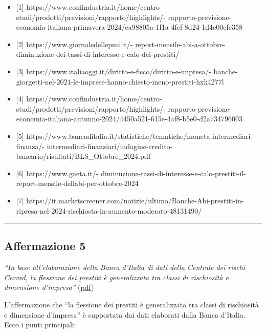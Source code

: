 \documentclass[
  letterpaper,
  DIV=11,
  numbers=noendperiod]{scrartcl}
\providecommand{\tightlist}{%
  \setlength{\itemsep}{0pt}\setlength{\parskip}{0pt}}\usepackage{longtable,booktabs,array}
\begin{document}
\begin{itemize}
\tightlist
\item
  {[}1{]}
  https://www.confindustria.it/home/centro-studi/prodotti/previsioni/rapporto/highlights/-
  rapporto-previsione-economia-italiana-primavera-2024/ca98805a-1f1a-4fef-8d24-1d4e00cfe358
\item
  {[}2{]} https://www.giornaledellepmi.it/-
  report-mensile-abi-a-ottobre-diminuzione-dei-tassi-di-interesse-e-calo-dei-prestiti/
\item
  {[}3{]} https://www.italiaoggi.it/diritto-e-fisco/diritto-e-impresa/-
  banche-giorgetti-nel-2024-le-imprese-hanno-chiesto-meno-prestiti-hxk4277l
\item
  {[}4{]}
  https://www.confindustria.it/home/centro-studi/prodotti/previsioni/rapporto/highlights/-
  rapporto-previsione-economia-italiana-autunno-2024/4450a521-615e-4af8-b5e0-d2a734796003
\item
  {[}5{]}
  https://www.bancaditalia.it/statistiche/tematiche/moneta-intermediari-finanza/-
  intermediari-finanziari/indagine-credito-bancario/risultati/BLS\_Ottobre\_2024.pdf
\item
  {[}6{]} https://www.gaeta.it/-
  diminuzione-tassi-di-interesse-e-calo-prestiti-il-report-mensile-dellabi-per-ottobre-2024
\item
  {[}7{]}
  https://it.marketscreener.com/notizie/ultimo/Banche-Abi-prestiti-in-ripresa-nel-2024-rischiosta-in-aumento-moderato-48131490/
\end{itemize}

\begin{center}\rule{0.5\linewidth}{0.5pt}\end{center}

\subsection{Affermazione 5}\label{affermazione-5}

\emph{``In base all'elaborazione della Banca d'Italia di dati della
Centrale dei rischi Cerved, la flessione dei prestiti è generalizzata
tra classi di rischiosità e dimensione d'impresa''}
(\href{zotero://open-pdf/library/items/B4RMZ7B3?page=2&annotation=33H6DFF3}{pdf})

L'affermazione che ``la flessione dei prestiti è generalizzata tra
classi di rischiosità e dimensione d'impresa'' è supportata dai dati
elaborati dalla Banca d'Italia. Ecco i punti principali:
\end{document}

